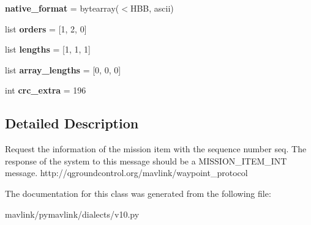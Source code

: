 \begin{DoxyCompactItemize}
{\bfseries native\+\_\+format} = bytearray(\textquotesingle{}$<$H\+BB\textquotesingle{}, \textquotesingle{}ascii\textquotesingle{})
\item 
\mbox{\label{classpymavlink_1_1dialects_1_1v10_1_1MAVLink__mission__request__int__message_ab91038be486bf04321c14550fe94176b}} 
list {\bfseries orders} = \mbox{[}1, 2, 0\mbox{]}
\item 
\mbox{\label{classpymavlink_1_1dialects_1_1v10_1_1MAVLink__mission__request__int__message_a0b17e29b4993ba34fca130c598041089}} 
list {\bfseries lengths} = \mbox{[}1, 1, 1\mbox{]}
\item 
\mbox{\label{classpymavlink_1_1dialects_1_1v10_1_1MAVLink__mission__request__int__message_a95b91c3882040a4301c75770c5d98aea}} 
list {\bfseries array\+\_\+lengths} = \mbox{[}0, 0, 0\mbox{]}
\item 
\mbox{\label{classpymavlink_1_1dialects_1_1v10_1_1MAVLink__mission__request__int__message_a5c99c25c1e1ffb440a770ddc8afed10f}} 
int {\bfseries crc\+\_\+extra} = 196
\end{DoxyCompactItemize}


\subsection{Detailed Description}
\begin{DoxyVerb}Request the information of the mission item with the sequence
number seq. The response of the system to this message should
be a MISSION_ITEM_INT message.
http://qgroundcontrol.org/mavlink/waypoint_protocol
\end{DoxyVerb}
 

The documentation for this class was generated from the following file\+:\begin{DoxyCompactItemize}
\item 
mavlink/pymavlink/dialects/v10.\+py\end{DoxyCompactItemize}
